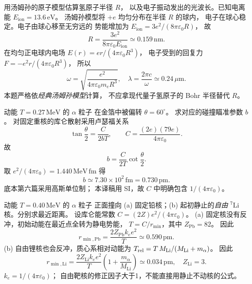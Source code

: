 
用汤姆孙的原子模型估算氢原子半径 $R$，
以及电子振动发出的光波长。已知电离能
$E_{\mathrm{ion}}=13.6\,\mathrm{eV}$。
\exsolution
汤姆孙模型将 $+e$ 均匀分布在半径 $R$ 的球内，
电子在球心稳定。电子由球心移至无穷远的
势能增加为
$E_{\mathrm{ion}}=3e^2/(8\pi\varepsilon_0R)$，
故
\[
 \boxed{R=\frac{3e^2}{8\pi\varepsilon_0E_{\mathrm{ion}}}
 \simeq0.159\,\mathrm{nm}}.
\]
在均匀正电球内电场 $E(r)=er/(4\pi\varepsilon_0R^3)$，
电子受到的回复力 $F=-e^2r/(4\pi\varepsilon_0R^3)$，
所以
\[
 \omega=\sqrt{\frac{e^2}{4\pi\varepsilon_0m_eR^3}},
 \quad\boxed{\lambda=\frac{2\pi c}{\omega}
 \simeq0.24\,\mu\mathrm m}.
\]
\excheck 本题严格依\emph{经典汤姆孙模型}计算，
不应拿现代量子氢原子的 Bohr 半径替代 $R$。

动能 $T=0.27\,\mathrm{MeV}$ 的 $\alpha$ 粒子
在金箔中被偏转 $\theta=60^\circ$。
求对应的碰撞瞄准参数 $b$。
\exsolution
对固定重核的库仑散射采用卢瑟福关系
\[
 \tan\frac\theta2=
 \frac{C}{2bT},\qquad
 C=\frac{(2e)(79e)}{4\pi\varepsilon_0}.
\]
故
\[
 \boxed{b=\frac C{2T}\cot\frac\theta2}.
\]
取 $e^2/(4\pi\varepsilon_0)
=1.440\,\mathrm{MeV\,fm}$ 得
\[
 \boxed{b\simeq7.30\times10^2\,\mathrm{fm}
 =0.730\,\mathrm{pm}}.
\]
\excheck 底本第六篇采用高斯单位制；
本译稿用 SI，故 $C$ 中明确包含 $1/(4\pi\varepsilon_0)$。

动能 $T=0.40\,\mathrm{MeV}$ 的 $\alpha$ 粒子
正面撞向 (a) 固定铅核；(b) 起初静止的\emph{自由}
$^{7}\mathrm{Li}$ 核。分别求最近距离。
\exsolution
设库仑能常数
$C=(2Z)e^2/(4\pi\varepsilon_0)$。
(a) 固定核没有反冲，初始动能在最近点全转为静电势能，
$T=C/r_{\min}$，其中 $Z_{\mathrm{Pb}}=82$。
因此
\[
 \boxed{r_{\min,\mathrm{Pb}}=\frac{2Z_{\mathrm{Pb}}k_e e^2}{T}
 \simeq0.590\,\mathrm{pm}}.
\]
(b) 自由锂核也会反冲，质心系相对动能为
$T_{\rm rel}=T\,M_{\rm Li}/(M_{\rm Li}+m_\alpha)$。
因此
\[
 \boxed{r_{\min,\mathrm{Li}}=
 \frac{2Z_{\mathrm{Li}}k_e e^2}{T}
 \left(1+\frac{m_\alpha}{M_{\mathrm{Li}}}\right)
 \simeq0.034\,\mathrm{pm}},
 \quad Z_{\mathrm{Li}}=3.
\]
\excheck $k_e=1/(4\pi\varepsilon_0)$；
自由靶核的修正因子大于1，不能直接用静止不动核的公式。

